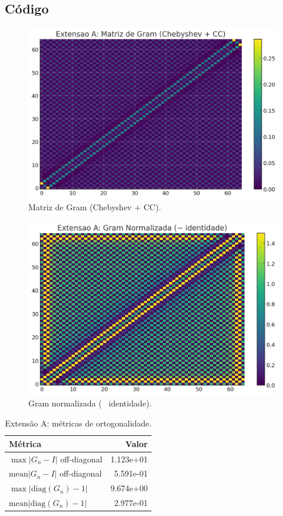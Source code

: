 \documentclass[11pt,a4paper]{article}
\begin{document}
\subsection*{Código}


\begin{figure}[h!]\centering
\includegraphics[width=0.75\linewidth]{figures/ext_ortho_gram.png}
\caption{Matriz de Gram (Chebyshev + CC).}
\label{fig:ext_gram}
\end{figure}
\begin{figure}[h!]\centering
\includegraphics[width=0.75\linewidth]{figures/ext_ortho_gram_norm.png}
\caption{Gram normalizada (~ identidade).}
\label{fig:ext_gram_norm}
\end{figure}
\begin{table}[h!]\centering
\caption{Extensão A: métricas de ortogonalidade.}
\label{tab:extA}
\begin{tabular}{l r}
\toprule
Métrica & Valor \\
\midrule
$\max|G_n - I|$ off-diagonal & 1.123e+01 \\
$\mathrm{mean}|G_n - I|$ off-diagonal & 5.591e-01 \\
$\max|\mathrm{diag}(G_n)-1|$ & 9.674e+00 \\
$\mathrm{mean}|\mathrm{diag}(G_n)-1|$ & 2.977e-01 \\
\bottomrule
\end{tabular}
\end{table}
\end{document}
